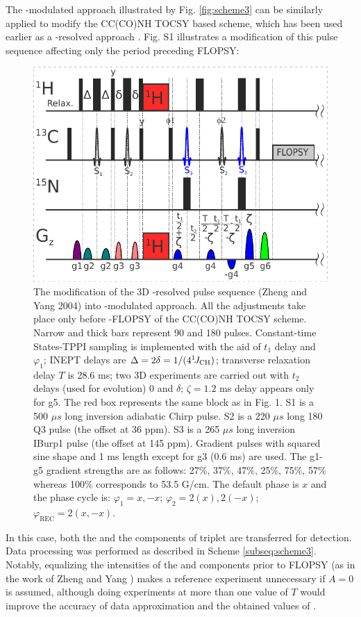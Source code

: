 \documentclass[smallextended]{svjour3}
\begin{document}
\newpage
The \oneJch-modulated approach illustrated by Fig. \ref{fig:scheme3} 
      can be similarly applied to modify the {CC(CO)NH} {TOCSY} based 
      scheme, which has been used earlier as a \oneJch-resolved approach
      \cite{zheng_measurement_2004}. Fig. S1 illustrates a modification of
      this pulse sequence affecting only the period preceding \clab{} 
      {FLOPSY}:
\begin{figure}
    \centering
    \includegraphics{FigS1}
    \caption{
       The modification of the 3D \oneJch-resolved pulse sequence (Zheng and Yang 2004) into \oneJch-modulated approach. All the adjustments take place only before \clab{}-FLOPSY of the CC(CO)NH TOCSY scheme. Narrow and thick bars represent 90\degree{} and 180\degree{} pulses. Constant-time \clab{} States-TPPI sampling is implemented with the aid of $t_1$ delay and $\varphi_1$; INEPT delays are $\Delta = 2\delta = 1/(4^1\!J_\text{CH})$; transverse relaxation delay $T$ is 28.6 ms; two 3D experiments are carried out with $t_2$ delays (used for \oneJch evolution) 0 and $\delta$; $\zeta = 1.2$ ms delay appears only for g5. The red box represents the same block as in Fig. 1. S1 is a 500 $\mu s$ long \clab{} inversion adiabatic Chirp pulse. S2 is a 220 $\mu s$ long 180\degree{} Q3 pulse (the offset at 36 ppm). S3 is a 265 $\mu s$ long inversion IBurp1 pulse (the offset at 145 ppm). Gradient pulses with squared sine shape and 1 ms length except for g3 (0.6 ms) are used. The g1-g5 gradient strengths are as follows: 27\%, 37\%, 47\%, 25\%, 75\%, 57\% whereas 100\% corresponds to 53.5 G/cm. The default phase is $x$ and the phase cycle is:
       $\varphi_1 = x, -x$;
       $\varphi_2 = 2(x), 2(-x)$;
       $\varphi_\text{REC} = 2(x, -x)$.
    }
    \label{fig:scheme4}
\end{figure}
In this case, both the \qouter{} and the \qinner{} 
      components of \clab{} triplet are transferred for detection. 
      Data processing was performed as described in Scheme
      \ref{subseq:scheme3}. Notably, equalizing the intensities of the 
      \qouter{} and \qinner{} components prior to {FLOPSY} (as in the work 
      of Zheng and Yang \cite{zheng_measurement_2004}) makes a reference
      experiment unnecessary if $A = 0$ is assumed, although doing 
      experiments at more than one value of $T$ would improve the accuracy 
      of data approximation and the obtained values of \gtwoCH.
\end{document}
